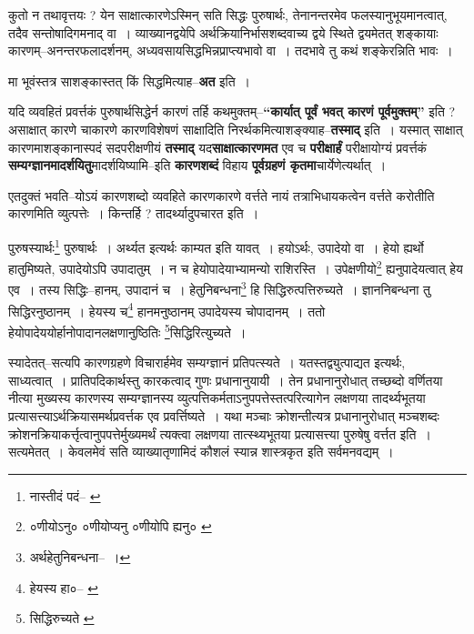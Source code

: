 \documentclass[article,12pt,a4paper]{memoir}
\begin{document}
	  \pstart कुतो न तथावृत्तयः ? येन साक्षात्कारणेऽस्मिन् सति सिद्धः पुरुषार्थः, तेनानन्तरमेव फलस्यानुभूयमानत्वात्, तदैव सन्तोषादिगमनाद् वा । व्याख्यानद्वयेपि अर्थक्रियानिर्भासशब्दवाच्य द्वये स्थिते द्वयमेतत् शङ्कायाः कारणम्--अनन्तरफलादर्शनम्, अध्यवसायसिद्धभिन्नप्राप्त्यभावो वा । तदभावे तु कथं शङ्केरन्निति भावः ।
	\pend
      

	  \pstart मा भूवंस्तत्र साशङ्कास्तत् किं सिद्धमित्याह--\textbf{अत} इति ।
	\pend
      

	  \pstart यदि व्यवहितं प्रवर्त्तकं पुरुषार्थसिद्धेर्न कारणं तर्हि कथमुक्तम्--\textbf{“कार्यात् पूर्वं भवत् कारणं पूर्वमुक्तम्”} इति ? असाक्षात् कारणे चाकारणे कारण\leavevmode{}विशेषणं साक्षादिति निरर्थकमित्याशङ्क्याह--\textbf{तस्माद्} इति । यस्मात् साक्षात् कारणमाशङ्कानास्पदं सदपरीक्षणीयं \textbf{तस्माद्} यद\textbf{साक्षात्कारणमत} एव च \textbf{परीक्षार्हं} परीक्षायोग्यं प्रवर्त्तकं \textbf{सम्यग्ज्ञानमादर्शयितु}मादर्शयिष्यामि--इति \textbf{कारणशब्दं} विहाय \textbf{पूर्वग्रहणं कृतमा}चार्येणेत्यर्थात् ।
	\pend
      

	  \pstart एतदुक्तं भवति--योऽयं कारणशब्दो व्यवहिते कारणकारणे वर्त्तते नायं तत्राभिधायकत्वेन वर्त्तते करोतीति कारणमिति व्युत्पत्तेः । किन्तर्हि ? तादर्थ्यादुपचारत इति ।
	\pend
	  \bigskip
	  \begingroup
	

	  \pstart पुरुषस्यार्थः\footnote{नास्तीदं पदं--\cite{dp-msA} \cite{dp-msB} \cite{dp-msD} \cite{dp-edP} \cite{dp-edH} \cite{dp-edE} \cite{dp-edN}} पुरुषार्थः । अर्थ्यत इत्यर्थः काम्यत इति यावत् । हयोऽर्थः, उपादेयो वा । हेयो ह्यर्थो हातुमिष्यते, उपादेयोऽपि उपादातुम् । न च हेयोपादेयाभ्यामन्यो राशिरस्ति । उपेक्षणीयो\footnote{०णीयोऽनु० \cite{dp-msA} ०णीयोप्यनु \cite{dp-msB} \cite{dp-edH} \cite{dp-edN} ०णीयोपि ह्यनु० \cite{dp-msC} \cite{dp-msD}} ह्यनुपादेयत्वात् हेय एव । तस्य सिद्धिः--हानम्, उपादानं च । हेतुनिबन्धना\footnote{अर्थहेतुनिबन्धना--\cite{dp-msD-n} ।} हि सिद्धिरुत्पत्तिरुच्यते । ज्ञाननिबन्धना तु सिद्धिरनुष्ठानम् । हेयस्य च\footnote{हेयस्य हा०--\cite{dp-msA} \cite{dp-msB} \cite{dp-edP} \cite{dp-edH} \cite{dp-edE} \cite{dp-edN}} हानमनुष्ठानम् उपादेयस्य चोपादानम् । ततो हेयोपादेययोर्हानोपादानलक्षणानुष्ठितिः \footnote{सिद्धिरुच्यते \cite{dp-msB}}\-सिद्धिरित्युच्यते ।
	\pend
      
	  \endgroup
	

	  \pstart स्यादेतत्--सत्यपि कारणग्रहणे विचारार्हमेव सम्यग्ज्ञानं प्रतिपत्स्यते । यतस्तद्व्युत्पाद्यत इत्यर्थः, साध्यत्वात् । प्रातिपदिकार्थस्तु कारकत्वाद् गुणः प्रधानानुयायी । तेन प्रधानानुरोधात् तच्छब्दो वर्णितया नीत्या मुख्यस्य कारणस्य सम्यग्ज्ञानस्य व्युत्पत्तिकर्मताऽनुपपत्तेस्तत्परित्यागेन लक्षणया तादर्थ्यभूतया प्रत्यासत्त्याऽर्थक्रियासमर्थप्रवर्त्तक एव प्रवर्त्तिष्यते । यथा मञ्चाः क्रोशन्तीत्यत्र प्रधानानुरोधात् मञ्चशब्दः क्रोशनक्रियाकर्त्तृत्वानुपपत्तेर्मुख्यमर्थं त्यक्त्वा लक्षणया तात्स्थ्यभूतया प्रत्यासत्त्या पुरुषेषु वर्त्तत इति । सत्यमेतत् । केवलमेवं सति व्याख्यातृणामिदं कौशलं स्यान्न शास्त्रकृत इति सर्वमनवद्यम् ।
	\pend
      
\end{document}
